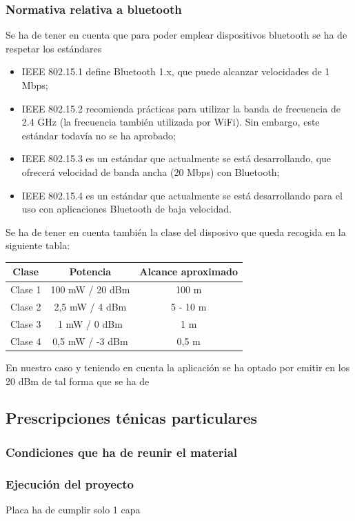 \documentclass[a4paper ,12pt, onecolumn]{article}
\begin{document}
    \subsubsection{Normativa relativa a bluetooth}
    Se ha de tener en cuenta que para poder emplear dispositivos bluetooth se ha de respetar los estándares
    \begin{itemize}
        \item IEEE 802.15.1 define Bluetooth 1.x, que puede alcanzar velocidades de 1 Mbps;
         \item IEEE 802.15.2 recomienda prácticas para utilizar la banda de frecuencia de 2.4 GHz (la frecuencia también utilizada por WiFi). Sin embargo, este estándar todavía no se ha aprobado;
         \item IEEE 802.15.3 es un estándar que actualmente se está desarrollando, que ofrecerá velocidad de banda ancha (20 Mbps) con Bluetooth;
         \item IEEE 802.15.4 es un estándar que actualmente se está desarrollando para el uso con aplicaciones Bluetooth de baja velocidad.
    \end{itemize}
    Se ha de tener en cuenta también la clase del disposivo que queda recogida en la siguiente tabla:
    \begin{center}
        \begin{tabular}{||c | c |c ||} 
        \hline
        Clase & Potencia  & Alcance aproximado\\ [0.5ex] 
        \hline\hline
        Clase 1 & 100 mW / 20 dBm & 100 m \\ 
        Clase 2 & 2,5 mW / 4 dBm & 5 - 10 m \\ 
        Clase 3 & 1 mW / 0 dBm & 1 m \\ 
        Clase 4 & 0,5 mW / -3 dBm & 0,5 m \\ 
    \hline
        \end{tabular}
    \end{center}
    En nuestro caso y teniendo en cuenta la aplicación se ha optado por emitir en los 20 dBm de tal forma
    que se ha de 
    \subsection{Prescripciones ténicas particulares}
        \subsubsection{Condiciones que ha de reunir el material}
        \subsubsection{Ejecución del proyecto}
        Placa ha de cumplir solo 1 capa
\end{document}
